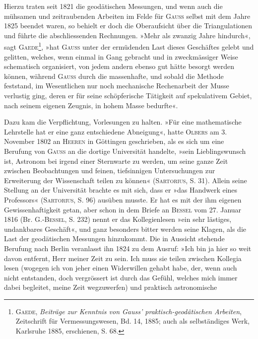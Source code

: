 \par
Hierzu traten seit 1821 die geodätischen Messungen, und wenn auch die
mühsamen und zeitraubenden Arbeiten im Felde für \textsc{Gauss} selbst mit dem
Jahre 1825 beendet waren, so behielt er doch die Oberaufsicht über die Triangulationen
und führte die abschliessenden Rechnungen. »Mehr als zwanzig
Jahre hindurch«, sagt \textsc{Gaede}\footnote{\textsc{Gaede}, \textit{Beiträge zur Kenntnis von Gauss' praktisch-geodätischen Arbeiten}, Zeitschrift für Vermessungswesen, Bd. 14, 1885; auch als selbständiges Werk, Karlsruhe 1885, erschienen, S. 68.}, »hat \textsc{Gauss} unter der ermüdenden Last dieses
Geschäftes gelebt und gelitten, welches, wenn einmal in Gang gebracht und
in zweckmässiger Weise schematisch organisiert, von jedem andern ebenso
gut hätte besorgt werden können, während \textsc{Gauss} durch die massenhafte, und
sobald die Methode feststand, im Wesentlichen nur noch mechanische Rechenarbeit
der Musse verlustig ging, deren er für seine schöpferische Tätigkeit
auf spekulativem Gebiet, nach seinem eigenen Zeugnis, in hohem Masse bedurfte«.
\par
Dazu kam die Verpflichtung, Vorlesungen zu halten. »Für eine mathematische
Lehrstelle hat er eine ganz entschiedene Abneigung«, hatte \textsc{Olbers}
\clearpage{}
\noindent am 3. November 1802 an \textsc{Heeren} in Göttingen geschrieben, als es sich um
eine Berufung von \textsc{Gauss} an die dortige Universität handelte, »sein Lieblingswunsch
ist, Astronom bei irgend einer Sternwarte zu werden, um seine ganze
Zeit zwischen Beobachtungen und feinen, tiefsinnigen Untersuchungen zur Erweiterung
der Wissenschaft teilen zu können« (\textsc{Sartorius}, S. 31). Allein seine
Stellung an der Universität brachte es mit sich, dass er »das Handwerk eines
Professors« (\textsc{Sartorius}, S. 96) ausüben musste. Er hat es mit der ihm eigenen
Gewissenhaftigkeit getan, aber schon in dem Briefe an \textsc{Bessel} vom 27. Januar
1816 (Br. G.-\textsc{Bessel}, S. 232) nennt er das Kollegienlesen »ein sehr lästiges,
undankbares Geschäft«, und ganz besonders bitter werden seine Klagen, als
die Last der geodätischen Messungen hinzukommt. Die in Aussicht stehende
Berufung nach Berlin veranlasst ihn 1824 zu dem Ausruf: »Ich bin ja hier
so weit davon entfernt, Herr meiner Zeit zu sein. Ich muss sie teilen zwischen
Kollegia lesen (wogegen ich von jeher einen Widerwillen gehabt habe, der,
wenn auch nicht entstanden, doch vergrössert ist durch das Gefühl, welches
mich immer dabei begleitet, meine Zeit wegzuwerfen) und praktisch astronomische

